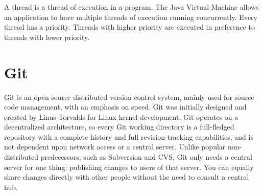 \noindent
A thread is a thread of execution in a program.
The Java Virtual Machine allows an application to have multiple threads of execution running
concurrently.
Every thread has a priority.
Threads with higher priority are executed in preference to threads with lower priority.


\section{Git}\label{sec:git}
Git is an open source distributed version control system, mainly used for source code
management, with an emphasis on speed.
Git was initially designed and created by Linus Torvalds for Linux kernel development.
Git operates on a decentralized architecture, so every Git working directory is a
full-fledged repository with a complete history and full revision-tracking capabilities,
and is not dependent upon network access or a central server.
Unlike popular non-distributed predecessors, such as Subversion and CVS, Git only needs a
central server for one thing: publishing changes to users of that server.
You can equally share changes directly with other people without the need to consult a central hub.

%
%


